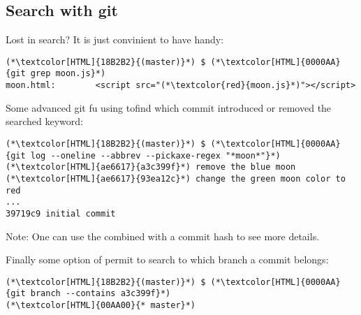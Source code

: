 \subsection{Search with git}
\begin{frame}[fragile]
  \subslidetitle
  Lost in search? It is just convinient to have  handy:
  \begin{lstlisting}
(*\textcolor[HTML]{18B2B2}{(master)}*) $ (*\textcolor[HTML]{0000AA}{git grep moon.js}*)
moon.html:        <script src="(*\textcolor{red}{moon.js}*)"></script>
\end{lstlisting}

  Some advanced git fu using  tofind which commit introduced or removed the searched keyword:
  \begin{lstlisting}
(*\textcolor[HTML]{18B2B2}{(master)}*) $ (*\textcolor[HTML]{0000AA}{git log --oneline --abbrev --pickaxe-regex "*moon*"}*)
(*\textcolor[HTML]{ae6617}{a3c399f}*) remove the blue moon
(*\textcolor[HTML]{ae6617}{93ea12c}*) change the green moon color to red
...
39719c9 initial commit
\end{lstlisting}

Note: One can use the  combined with a commit hash to see more details.

  Finally some option of  permit to search to which branch a commit belongs:
  \begin{lstlisting}
(*\textcolor[HTML]{18B2B2}{(master)}*) $ (*\textcolor[HTML]{0000AA}{git branch --contains a3c399f}*)
(*\textcolor[HTML]{00AA00}{* master}*)
\end{lstlisting}
\end{frame}

